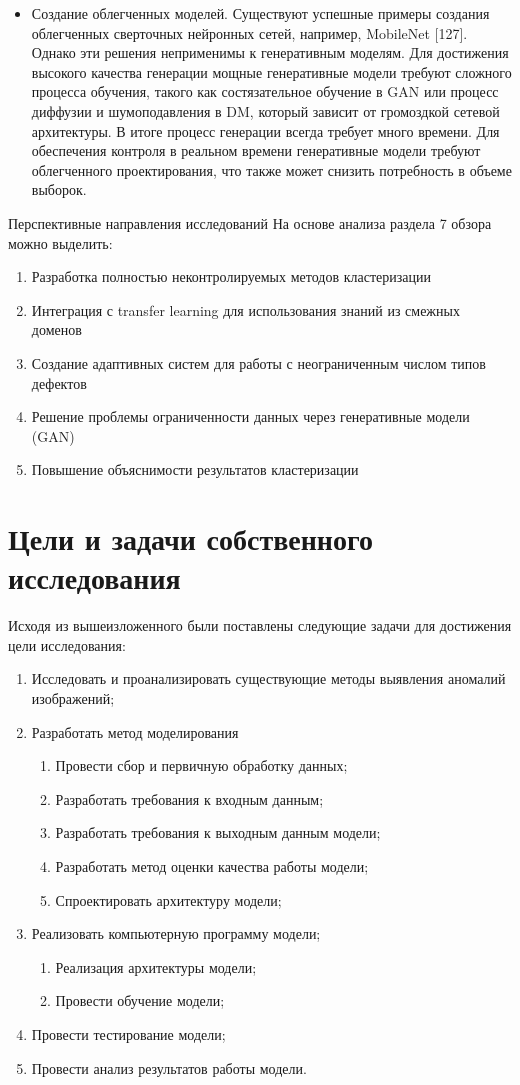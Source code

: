 \documentclass[14pt,a4paper]{article}
\begin{document}
\begin{itemize}
	\item Создание облегченных моделей. Существуют успешные примеры создания облегченных сверточных нейронных сетей, например, MobileNet [127]. Однако эти решения неприменимы к генеративным моделям. Для достижения высокого качества генерации мощные генеративные модели требуют сложного процесса обучения, такого как состязательное обучение в GAN или процесс диффузии и шумоподавления в DM, который зависит от громоздкой сетевой архитектуры. В итоге процесс генерации всегда требует много времени. Для обеспечения контроля в реальном времени генеративные модели требуют облегченного проектирования, что также может снизить потребность в объеме выборок.
\end{itemize} \cite{YuHe2024}
	Перспективные направления исследований
	На основе анализа раздела 7 обзора \cite{Bhatt2021} можно выделить:
	\begin{enumerate}
		\item Разработка полностью неконтролируемых методов кластеризации
		\item Интеграция с transfer learning для использования знаний из смежных доменов
		\item Создание адаптивных систем для работы с неограниченным числом типов дефектов
		\item Решение проблемы ограниченности данных через генеративные модели (GAN)
		\item Повышение объяснимости результатов кластеризации
	\end{enumerate}

\section{Цели и задачи собственного исследования}
Исходя из вышеизложенного были поставлены следующие задачи для достижения цели исследования:
\begin{enumerate}
	\item Исследовать и проанализировать существующие методы выявления аномалий изображений;
	\item Разработать метод моделирования
	\begin{enumerate}
		\item Провести сбор и первичную обработку данных;
		\item Разработать требования к входным данным;
		\item Разработать требования к выходным данным модели;
		\item Разработать метод оценки качества работы модели;
		\item Спроектировать архитектуру модели;
	\end{enumerate}
	\item Реализовать компьютерную программу модели;
	\begin{enumerate}
		\item Реализация архитектуры модели;
		\item Провести обучение модели;
	\end{enumerate}
	\item Провести тестирование модели;
	\item Провести анализ результатов работы модели.
\end{enumerate}
\end{document}

